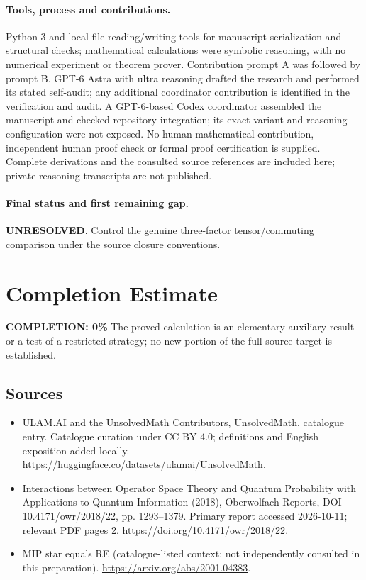\documentclass[11pt]{article}
\begin{document}
\paragraph{Tools, process and contributions.}
Python 3 and local file-reading/writing tools for manuscript serialization and structural checks; mathematical calculations were symbolic reasoning, with no numerical experiment or theorem prover. Contribution prompt A was followed by prompt B. GPT-6 Astra with ultra reasoning drafted the research and performed its stated self-audit; any additional coordinator contribution is identified in the verification and audit. A GPT-6-based Codex coordinator assembled the manuscript and checked repository integration; its exact variant and reasoning configuration were not exposed. No human mathematical contribution, independent human proof check or formal proof certification is supplied. Complete derivations and the consulted source references are included here; private reasoning transcripts are not published.

\paragraph{Final status and first remaining gap.}
\textbf{UNRESOLVED}. Control the genuine three-factor tensor/commuting comparison under the source closure conventions.

\section{Completion Estimate}
\noindent\textbf{COMPLETION: 0\%}
The proved calculation is an elementary auxiliary result or a test of a restricted strategy; no new portion of the full source target is established.

\subsection{Sources}
\begin{itemize}
\item[\hypertarget{source:statement:1}{S1}] ULAM.AI and the UnsolvedMath Contributors, UnsolvedMath, catalogue entry. Catalogue curation under CC BY 4.0; definitions and English exposition added locally.
\url{https://huggingface.co/datasets/ulamai/UnsolvedMath}.
\item[\hypertarget{source:statement:2}{S2}] Interactions between Operator Space Theory and Quantum Probability with Applications to Quantum Information (2018), Oberwolfach Reports, DOI 10.4171/owr/2018/22, pp. 1293--1379. Primary report accessed 2026-10-11; relevant PDF pages 2.
\url{https://doi.org/10.4171/owr/2018/22}.
\item[\hypertarget{source:statement:3}{S3}] MIP star equals RE (catalogue-listed context; not independently consulted in this preparation).
\url{https://arxiv.org/abs/2001.04383}.
\end{itemize}
\label{end:statement}
\end{document}
